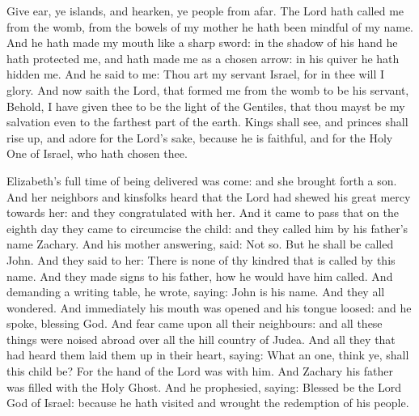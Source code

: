 
Give ear, ye islands, and hearken, ye people from afar. The Lord
hath called me from the womb, from the bowels of my mother he hath been
mindful of my name.
And he hath made my mouth like a sharp sword: in the shadow of his
hand he hath protected me, and hath made me as a chosen arrow: in his
quiver he hath hidden me.
And he said to me: Thou art my servant Israel, for in thee will I
glory.
And now saith the Lord, that formed me from the womb to be his
servant, %
Behold, I have given thee to be the light of the Gentiles, that thou
mayst be my salvation even to the farthest part of the earth.
Kings shall see, and princes shall rise up, and adore for the
Lord's sake, because he is faithful, and for the Holy One of Israel, who
hath chosen thee.




Elizabeth's full time of being delivered was come: and she
brought forth a son.
And her neighbors and kinsfolks heard that the Lord had shewed his
great mercy towards her: and they congratulated with her.
And it came to pass that on the eighth day they came to circumcise
the child: and they called him by his father's name Zachary.
And his mother answering, said: Not so. But he shall be called
John.
And they said to her: There is none of thy kindred that is called
by this name.
And they made signs to his father, how he would have him called.
And demanding a writing table, he wrote, saying: John is his name.
And they all wondered.
And immediately his mouth was opened and his tongue loosed: and he
spoke, blessing God.
And fear came upon all their neighbours: and all these things were
noised abroad over all the hill country of Judea.
And all they that had heard them laid them up in their heart,
saying: What an one, think ye, shall this child be? For the hand of the
Lord was with him.
And Zachary his father was filled with the Holy Ghost. And he
prophesied, saying:
Blessed be the Lord God of Israel: because he hath visited and
wrought the redemption of his people.




